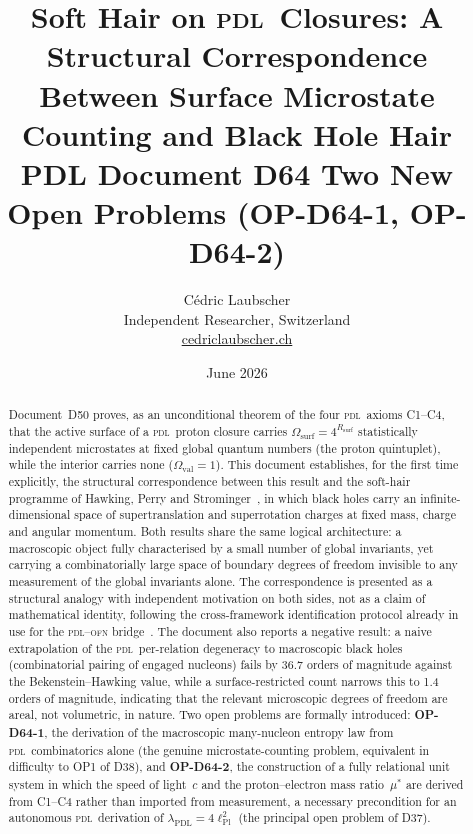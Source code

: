 \documentclass[12pt,a4paper]{article}
\newcommand{\PDL}{\textsc{pdl}}
\newcommand{\Rsurf}{R_{\mathrm{surf}}}
\newcommand{\Omegasurf}{\Omega_{\mathrm{surf}}}
\newcommand{\lPl}{\ell_{\mathrm{Pl}}}
\begin{document}
\title{\textbf{Soft Hair on \PDL\ Closures: A Structural Correspondence
Between Surface Microstate Counting and Black Hole Hair}\\[6pt] {\large PDL Document D64 \textemdash{} Two New Open Problems (OP-D64-1, OP-D64-2)}}

\author{C\'edric Laubscher\\[4pt]
\small Independent Researcher, Switzerland\\
\small \href{https://cedriclaubscher.ch}{cedriclaubscher.ch}}

\date{June 2026}

\maketitle

\begin{abstract}
Document~D50 proves, as an unconditional theorem of the four \PDL\ axioms C1--C4, that the active surface of a \PDL\ proton closure carries $\Omegasurf = 4^{\Rsurf}$ statistically independent microstates at fixed global quantum numbers (the proton quintuplet), while the interior carries none ($\Omega_{\mathrm{val}}=1$). This document establishes, for the first time explicitly, the structural correspondence between this result and the soft-hair programme of Hawking, Perry and Strominger~\cite{HPS2016,HPS2017}, in which black holes carry an infinite-dimensional space of supertranslation and superrotation charges at fixed mass, charge and angular momentum. Both results share the same logical architecture: a macroscopic object fully characterised by a small number of global invariants, yet carrying a combinatorially large space of boundary degrees of freedom invisible to any measurement of the global invariants alone. The correspondence is presented as a structural analogy with independent motivation on both sides, not as a claim of mathematical identity, following the cross-framework identification protocol already in use for the \PDL--\textsc{ofn} bridge~\cite{N02}. The document also reports a negative result: a naive extrapolation of the \PDL\ per-relation degeneracy to macroscopic black holes (combinatorial pairing of engaged nucleons) fails by 36.7 orders of magnitude against the Bekenstein--Hawking value, while a surface-restricted count narrows this to 1.4 orders of magnitude, indicating that the relevant microscopic degrees of freedom are areal, not volumetric, in nature. Two open problems are formally introduced: \textbf{OP-D64-1}, the derivation of the macroscopic many-nucleon entropy law from \PDL\ combinatorics alone (the genuine microstate-counting problem, equivalent in difficulty to OP1 of D38), and \textbf{OP-D64-2}, the construction of a fully relational unit system in which the speed of light~$c$ and the proton--electron mass ratio~$\mu^*$ are derived from C1--C4 rather than imported from measurement, a necessary precondition for an autonomous \PDL\ derivation of $\lambda_{\mathrm{PDL}} = 4\lPl^2$ (the principal open problem of D37).
\end{abstract}
\end{document}
